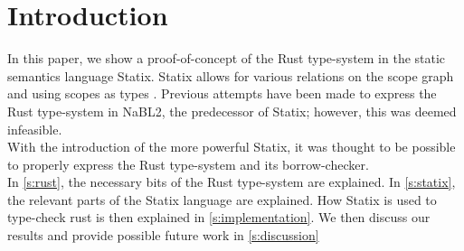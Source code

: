 \section{Introduction}
In this paper, we show a proof-of-concept of the Rust type-system in the static semantics language Statix. Statix allows for various relations on the scope graph and using scopes as types \citep{antwerpen}. Previous attempts have been made to express the Rust type-system in NaBL2, the predecessor of Statix; however, this was deemed infeasible. \\
With the introduction of the more powerful Statix, it was thought to be possible to properly express the Rust type-system and its borrow-checker.\\
In \autoref{s:rust}, the necessary bits of the Rust type-system are explained. In \autoref{s:statix}, the relevant parts of the Statix language are explained. How Statix is used to type-check rust is then explained in \autoref{s:implementation}. We then discuss our results and provide possible future work in \autoref{s:discussion} 











